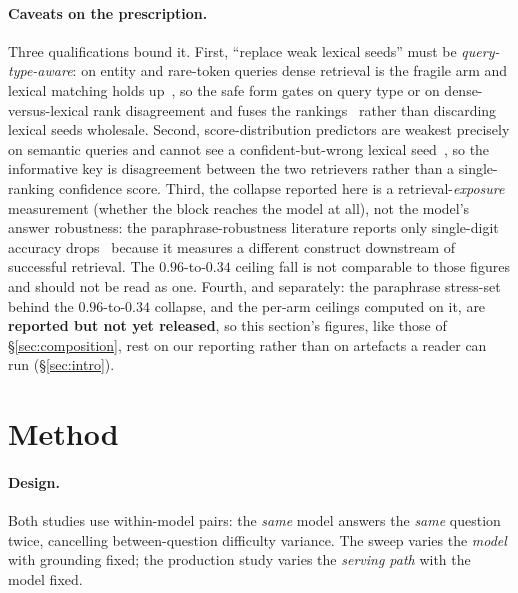 \documentclass[10pt,twocolumn]{article}
\begin{document}
\paragraph{Caveats on the prescription.} Three qualifications bound it. First, ``replace weak lexical seeds'' must be \emph{query-type-aware}: on entity and rare-token queries dense retrieval is the fragile arm and lexical matching holds up~\cite{entityquestions2021}, so the safe form gates on query type or on dense-versus-lexical rank disagreement and fuses the rankings~\cite{rrf2009} rather than discarding lexical seeds wholesale. Second, score-distribution predictors are weakest precisely on semantic queries and cannot see a confident-but-wrong lexical seed~\cite{qppneural2023}, so the informative key is disagreement between the two retrievers rather than a single-ranking confidence score. Third, the collapse reported here is a retrieval-\emph{exposure} measurement (whether the block reaches the model at all), not the model's answer robustness: the paraphrase-robustness literature reports only single-digit accuracy drops~\cite{benchrobust2025} because it measures a different construct downstream of successful retrieval. The $0.96$-to-$0.34$ ceiling fall is not comparable to those figures and should not be read as one. Fourth, and separately: the paraphrase stress-set behind the $0.96$-to-$0.34$ collapse, and the per-arm ceilings computed on it, are \textbf{reported but not yet released}, so this section's figures, like those of \S\ref{sec:composition}, rest on our reporting rather than on artefacts a reader can run (\S\ref{sec:intro}).

\section{Method}\label{sec:method}
\paragraph{Design.} Both studies use within-model pairs: the \emph{same} model answers the \emph{same} question twice, cancelling between-question difficulty variance. The sweep varies the \emph{model} with grounding fixed; the production study varies the \emph{serving path} with the model fixed.
\end{document}
